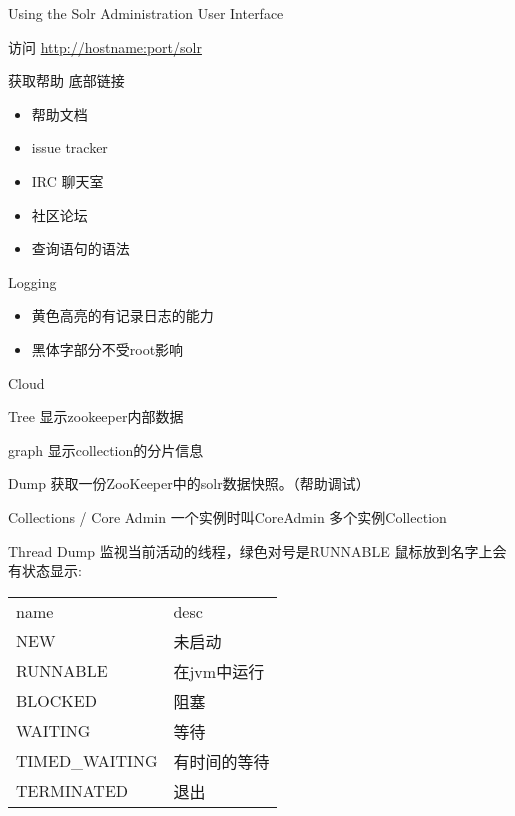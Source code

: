 \documentclass[presentation]{beamer}
\begin{document}
\begin{frame}[label={sec:org5755c49}]{Using the Solr Administration User Interface}
\begin{block}{访问}
\url{http://hostname:port/solr}
\end{block}


\begin{block}{获取帮助}
底部链接
\begin{itemize}
\item 帮助文档
\item issue tracker
\item IRC 聊天室
\item 社区论坛
\item 查询语句的语法
\end{itemize}
\end{block}


\begin{block}{Logging}
\begin{itemize}
\item 黄色高亮的有记录日志的能力
\item 黑体字部分不受root影响
\end{itemize}
\end{block}


\begin{block}{Cloud}
\begin{block}{Tree}
显示zookeeper内部数据
\end{block}

\begin{block}{graph}
显示collection的分片信息
\end{block}

\begin{block}{Dump}
获取一份ZooKeeper中的solr数据快照。（帮助调试）
\end{block}
\end{block}


\begin{block}{Collections / Core Admin}
一个实例时叫CoreAdmin 多个实例Collection
\end{block}


\begin{block}{Thread Dump}
监视当前活动的线程，绿色对号是RUNNABLE
鼠标放到名字上会有状态显示:
\begin{center}
\begin{tabular}{ll}
name & desc\\
NEW & 未启动\\
RUNNABLE & 在jvm中运行\\
BLOCKED & 阻塞\\
WAITING & 等待\\
TIMED\_WAITING & 有时间的等待\\
TERMINATED & 退出\\
\end{tabular}
\end{center}
\end{block}



\end{frame}
\end{document}
